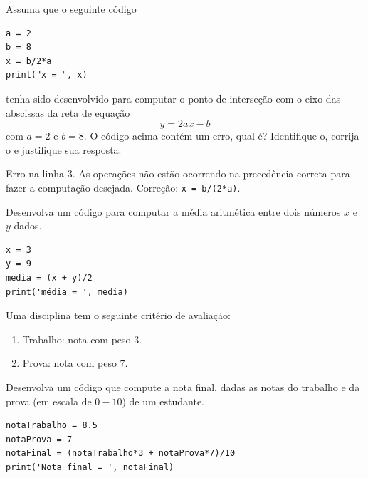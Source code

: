 \begin{exer}
  Assuma que o seguinte código {\python}

\begin{lstlisting}
a = 2
b = 8
x = b/2*a
print("x = ", x)
\end{lstlisting}

tenha sido desenvolvido para computar o ponto de interseção com o eixo das abscissas da reta de equação
  \begin{equation}
    y = 2ax - b
  \end{equation}
  com $a=2$ e $b=8$. O código acima contém um erro, qual é? Identifique-o, corrija-o e justifique sua resposta.
\end{exer}
\begin{resp}
  Erro na linha 3. As operações não estão ocorrendo na precedência correta para fazer a computação desejada. Correção: \lstinline+x = b/(2*a)+.
\end{resp}

\begin{exer}
  Desenvolva um código {\python} para computar a média aritmética entre dois números $x$ e $y$ dados.
\end{exer}
\begin{resp}

\begin{lstlisting}
x = 3
y = 9
media = (x + y)/2
print('média = ', media)
\end{lstlisting}

\end{resp}

\begin{exer}
  Uma disciplina tem o seguinte critério de avaliação:
  \begin{enumerate}
  \item Trabalho: nota com peso 3.
  \item Prova: nota com peso 7.
  \end{enumerate}
  Desenvolva um código {\python} que compute a nota final, dadas as notas do trabalho e da prova (em escala de $0 - 10$) de um estudante.
\end{exer}
\begin{resp}

\begin{lstlisting}
notaTrabalho = 8.5
notaProva = 7
notaFinal = (notaTrabalho*3 + notaProva*7)/10
print('Nota final = ', notaFinal)
\end{lstlisting}

\end{resp}

